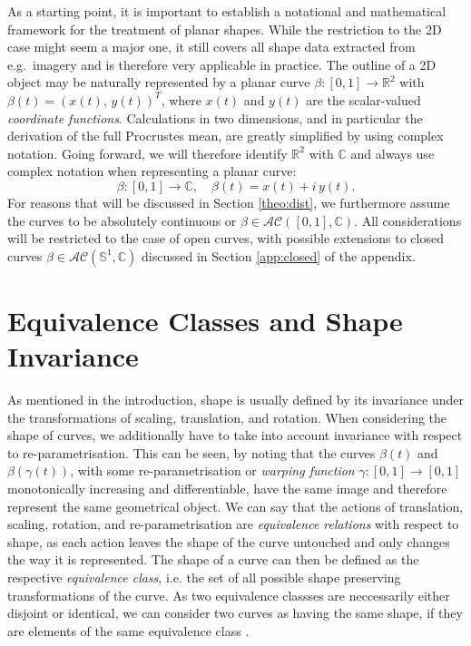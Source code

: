 As a starting point, it is important to establish a notational and mathematical framework for the treatment of planar shapes.
While the restriction to the 2D case might seem a major one, it still covers all shape data extracted from e.g.\ imagery and is therefore very applicable in practice.
The outline of a 2D object may be naturally represented by a planar curve $\beta : [0,1] \rightarrow \mathbb{R}^2$ with $\beta(t) = (x(t),\, y(t))^T$, where $x(t)$ and $y(t)$ are the scalar-valued \textit{coordinate functions}.
Calculations in two dimensions, and in particular the derivation of the full Procrustes mean, are greatly simplified by using complex notation.
Going forward, we will therefore identify $\mathbb{R}^2$ with $\mathbb{C}$ and always use complex notation when representing a planar curve:
$$\beta : [0,1] \rightarrow \mathbb{C}, \quad \beta(t) = x(t) + i\, y(t).$$
For reasons that will be discussed in Section \ref{theo:dist}, we furthermore assume the curves to be absolutely continuous or $\beta \in \mathcal{AC}([0,1], \mathbb{C})$.
All considerations will be restricted to the case of open curves, with possible extensions to closed curves $\beta \in \mathcal{AC}(\mathbb{S}^1, \mathbb{C})$ discussed in Section \ref{app:closed} of the appendix.


\section{Equivalence Classes and Shape Invariance}
\label{theo:inv}
As mentioned in the introduction, shape is usually defined by its invariance under the transformations of scaling, translation, and rotation.
When considering the shape of curves, we additionally have to take into account invariance with respect to re-parametrisation.
This can be seen, by noting that the curves $\beta(t)$ and $\beta(\gamma(t))$, with some re-parametrisation or \textit{warping function} $\gamma : [0,1] \rightarrow [0,1]$ monotonically increasing and differentiable, have the same image and therefore represent the same geometrical object.
We can say that the actions of translation, scaling, rotation, and re-parametrisation are \textit{equivalence relations} with respect to shape, as each action leaves the shape of the curve untouched and only changes the way it is represented.
The shape of a curve can then be defined as the respective \textit{equivalence class}, i.e. the set of all possible shape preserving transformations of the curve.
As two equivalence classses are neccessarily either disjoint or identical, we can consider two curves as having the same shape, if they are elements of the same equivalence class \parencite[see][40]{SrivastavaKlassen2016}.

